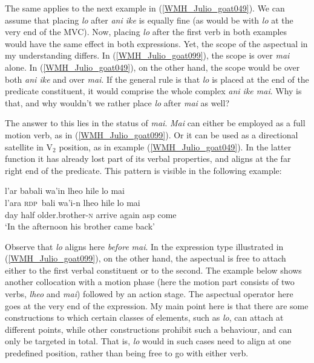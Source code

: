 The same applies to the next example in (\ref{WMH_Julio_goat049}). We can assume that placing \textit{lo} after \textit{ani ike} is equally fine (as would be with \textit{lo} at the very end of the MVC). Now, placing \textit{lo} after the first verb in both examples would have the same effect in both expressions. Yet, the scope of the aspectual in my understanding differs. In (\ref{WMH_Julio_goat099}), the scope is over \textit{mai} alone. In (\ref{WMH_Julio_goat049}), on the other hand, the scope would be over both \textit{ani ike} and over \textit{mai}. If the general rule is that \textit{lo} is placed at the end of the predicate constituent, it would comprise the whole complex \textit{ani ike mai}.  Why is that, and why wouldn't we rather place \textit{lo} after \textit{mai} as well?

The answer to this lies in the status of \textit{mai}. \textit{Mai} can either be employed as a full motion verb, as in (\ref{WMH_Julio_goat099}). Or it can be used as a directional satellite in V$_2$ position, as in example (\ref{WMH_Julio_goat049}). In the latter function it has already lost part of its verbal properties, and aligns at the far right end of the predicate. This pattern is visible in the following example:
 
\ea
\gll l'ar babali wa'in lheo hile lo mai \\
l'ara \textsc{rdp}~bali wa'i-n lheo hile lo mai \\
\glc day half older.brother-\textsc{n} arrive again \acs{asp} come\\
\glft `In the afternoon his brother came back' \ 
\z
\xe

Observe that \textit{lo} aligns here \emph{before} \textit{mai}. In the expression type illustrated in (\ref{WMH_Julio_goat099}), on the other hand, the aspectual is free to attach either to the first verbal constituent or to the second. The example below shows another collocation with a motion phase (here the motion part consists of two verbs, \textit{lheo} and \textit{mai}) followed by an action stage. The aspectual operator here goes at the very end of the expression. My main point here is that there are some constructions to which certain classes of elements, such as \textit{lo}, can attach at different points, while other constructions prohibit such a behaviour, and can only be targeted in total. That is, \textit{lo} would in such cases need to align at one predefined position, rather than being free to go with either verb.

